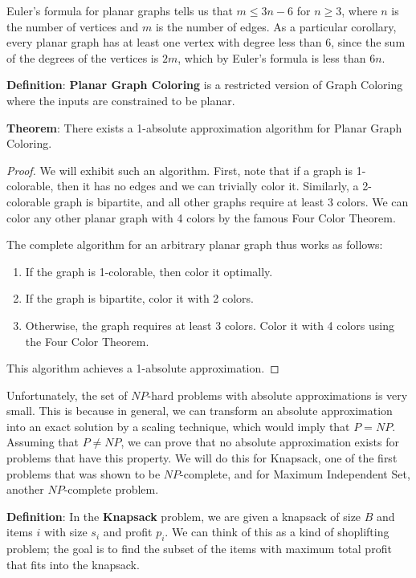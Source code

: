 \documentclass{article}
\begin{document}
Euler's formula for planar graphs tells us that $m \le 3n-6$ for $n\ge
3$, where $n$ is the number of vertices and $m$ is the number of
edges.  As a particular corollary, every planar graph has at least one
vertex with degree less than 6, since the sum of the degrees of the
vertices is $2m$, which by Euler's formula is less than $6n$.


\textbf{Definition}:
  \textbf{Planar Graph Coloring} is a restricted version
  of Graph Coloring where the inputs are constrained to be planar.

\textbf{Theorem}:
There exists a 1-absolute approximation algorithm for Planar Graph
Coloring.

\begin{proof}
We will exhibit such an algorithm.  First, note that if a graph is
1-colorable, then it has no edges and we can trivially color it.
Similarly, a 2-colorable graph is bipartite, and all other graphs
require at least 3 colors.  We can color any other planar graph with 4
colors by the famous Four Color Theorem.

The complete algorithm for an arbitrary planar graph thus works as follows:
\begin{enumerate}
\item If the graph is 1-colorable, then color it optimally.
\item If the graph is bipartite, color it with 2 colors.
\item Otherwise, the graph requires at least 3 colors.  Color it with
  4 colors using the Four Color Theorem.
\end{enumerate}
This algorithm achieves a 1-absolute approximation.
\end{proof}

Unfortunately, the set of $NP$-hard problems with absolute
approximations is very small.  This is because in general, we can
transform an absolute approximation into an exact solution by a
scaling technique, which would imply that $P=NP$.  Assuming that $P\ne
NP$, we can prove that no absolute approximation exists for problems
that have this property.  We will do this for Knapsack, one of the
first problems that was shown to be $NP$-complete, and for Maximum
Independent Set, another $NP$-complete problem.

\textbf{Definition}:
In the \textbf{Knapsack} problem, we are given a
  knapsack of size $B$ and items $i$ with size $s_i$ and profit $p_i$.
  We can think of this as a kind of shoplifting problem; the goal is
  to find the subset of the items with maximum total profit that fits
  into the knapsack.
\end{document}
